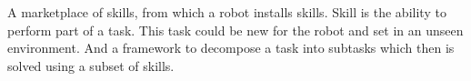 A marketplace of skills, from which a robot installs skills. Skill is the ability to perform part of a task. This task could be new for the robot and set in an unseen environment.
And a framework to decompose a task into subtasks which then is solved using a subset of skills. 
